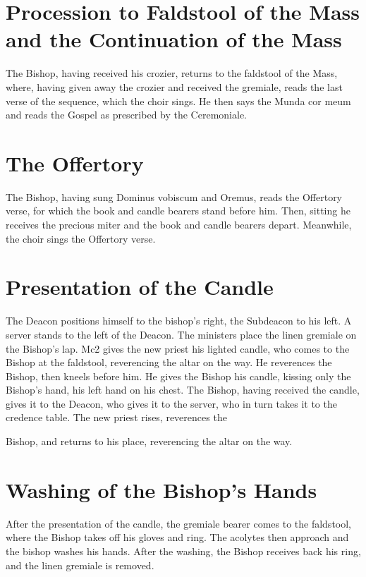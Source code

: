 \documentclass{report}
\begin{document}
{	\section{Procession to Faldstool of the Mass and the Continuation of the
	Mass}

	The Bishop, having received his crozier, returns to the faldstool of the
	Mass, where, having given away the crozier and received the gremiale, reads
	the last verse of the sequence, which the choir sings. He then says the
	Munda cor meum and reads the Gospel as prescribed by the Ceremoniale.

	\section{The Offertory}

	The Bishop, having sung Dominus vobiscum and Oremus, reads the Offertory
	verse, for which the book and candle bearers stand before him. Then,
	sitting he receives the precious miter and the book and candle bearers
	depart. Meanwhile, the choir sings the Offertory verse.

	\section{Presentation of the Candle}

	The Deacon positions himself to the bishop’s right, the Subdeacon to his
	left. A server stands to the left of the Deacon. The ministers place the
	linen gremiale on the Bishop’s lap. Mc2 gives the new priest his lighted
	candle, who comes to the Bishop at the faldstool, reverencing the altar on
	the way. He reverences the Bishop, then kneels before him. He gives the
	Bishop his candle, kissing only the Bishop’s hand, his left hand on his
	chest. The Bishop, having received the candle, gives it to the Deacon, who
	gives it to the server, who in turn takes it to the credence table. The new
	priest rises, reverences the

	Bishop, and returns to his place, reverencing the altar on the way.

	\section{Washing of the Bishop’s Hands}

	After the presentation of the candle, the gremiale bearer comes to the
	faldstool, where the Bishop takes off his gloves and ring. The acolytes
	then approach and the bishop washes his hands. After the washing, the
	Bishop receives back his ring, and the linen gremiale is removed.

}
\end{document}
